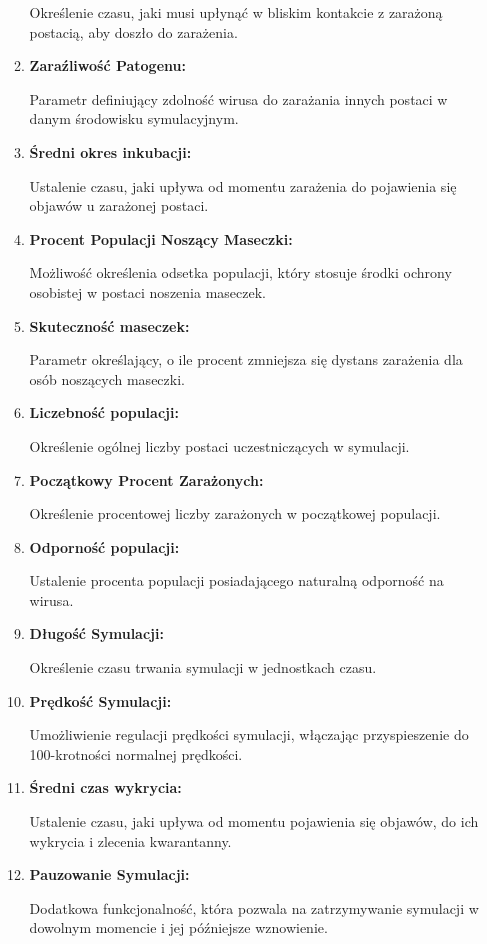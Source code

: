 \begin{itemize}
\begin{enumerate}
		Określenie czasu, jaki musi upłynąć w bliskim kontakcie z zarażoną postacią, aby doszło do zarażenia.
		\item \textbf{Zaraźliwość Patogenu:}
		
		Parametr definiujący zdolność wirusa do zarażania innych postaci w danym środowisku symulacyjnym.
		\item \textbf{Średni okres inkubacji:}
		
		Ustalenie czasu, jaki upływa od momentu zarażenia do pojawienia się objawów u zarażonej postaci.
		\item \textbf{Procent Populacji Noszący Maseczki:}
		
		Możliwość określenia odsetka populacji, który stosuje środki ochrony osobistej w postaci noszenia maseczek.
		\item \textbf{Skuteczność maseczek:}
		
		Parametr określający, o ile procent zmniejsza się dystans zarażenia dla osób noszących maseczki.
		\item \textbf{Liczebność populacji:}
		
		Określenie ogólnej liczby postaci uczestniczących w symulacji.
		
		\item \textbf{Początkowy Procent Zarażonych:}
		
		Określenie procentowej liczby zarażonych w początkowej populacji.
		\item \textbf{Odporność populacji:}
		
		Ustalenie procenta populacji posiadającego naturalną odporność na wirusa.
		\item \textbf{Długość Symulacji:}
		
		Określenie czasu trwania symulacji w jednostkach czasu.
		\item \textbf{Prędkość Symulacji:}
		
		Umożliwienie regulacji prędkości symulacji, włączając przyspieszenie do 100-krotności normalnej prędkości.
		
		\item \textbf{Średni czas wykrycia:}
		
		Ustalenie czasu, jaki upływa od momentu pojawienia się objawów, do ich wykrycia i zlecenia kwarantanny.
		\item \textbf{Pauzowanie Symulacji:}
		
		Dodatkowa funkcjonalność, która pozwala na zatrzymywanie symulacji w dowolnym momencie i jej późniejsze wznowienie.
	\end{enumerate}
\end{itemize}
